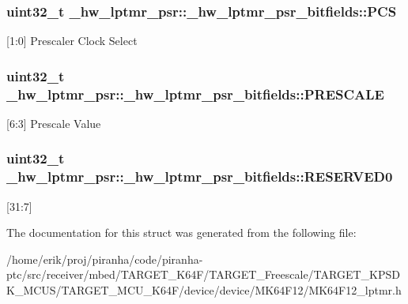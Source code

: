 \subsubsection[{\texorpdfstring{P\+CS}{PCS}}]{\setlength{\rightskip}{0pt plus 5cm}uint32\+\_\+t \+\_\+hw\+\_\+lptmr\+\_\+psr\+::\+\_\+hw\+\_\+lptmr\+\_\+psr\+\_\+bitfields\+::\+P\+CS}\hypertarget{struct__hw__lptmr__psr_1_1__hw__lptmr__psr__bitfields_a3d993db71ade53cda87fdd760944e461}{}\label{struct__hw__lptmr__psr_1_1__hw__lptmr__psr__bitfields_a3d993db71ade53cda87fdd760944e461}
\mbox{[}1\+:0\mbox{]} Prescaler Clock Select 
\subsubsection[{\texorpdfstring{P\+R\+E\+S\+C\+A\+LE}{PRESCALE}}]{\setlength{\rightskip}{0pt plus 5cm}uint32\+\_\+t \+\_\+hw\+\_\+lptmr\+\_\+psr\+::\+\_\+hw\+\_\+lptmr\+\_\+psr\+\_\+bitfields\+::\+P\+R\+E\+S\+C\+A\+LE}\hypertarget{struct__hw__lptmr__psr_1_1__hw__lptmr__psr__bitfields_ac527885cc4bac77eb8aef76aff1d8eb8}{}\label{struct__hw__lptmr__psr_1_1__hw__lptmr__psr__bitfields_ac527885cc4bac77eb8aef76aff1d8eb8}
\mbox{[}6\+:3\mbox{]} Prescale Value 
\subsubsection[{\texorpdfstring{R\+E\+S\+E\+R\+V\+E\+D0}{RESERVED0}}]{\setlength{\rightskip}{0pt plus 5cm}uint32\+\_\+t \+\_\+hw\+\_\+lptmr\+\_\+psr\+::\+\_\+hw\+\_\+lptmr\+\_\+psr\+\_\+bitfields\+::\+R\+E\+S\+E\+R\+V\+E\+D0}\hypertarget{struct__hw__lptmr__psr_1_1__hw__lptmr__psr__bitfields_a951991bdbc5b80c79a6a9b209fd12ac4}{}\label{struct__hw__lptmr__psr_1_1__hw__lptmr__psr__bitfields_a951991bdbc5b80c79a6a9b209fd12ac4}
\mbox{[}31\+:7\mbox{]} 

The documentation for this struct was generated from the following file\+:\begin{DoxyCompactItemize}
\item 
/home/erik/proj/piranha/code/piranha-\/ptc/src/receiver/mbed/\+T\+A\+R\+G\+E\+T\+\_\+\+K64\+F/\+T\+A\+R\+G\+E\+T\+\_\+\+Freescale/\+T\+A\+R\+G\+E\+T\+\_\+\+K\+P\+S\+D\+K\+\_\+\+M\+C\+U\+S/\+T\+A\+R\+G\+E\+T\+\_\+\+M\+C\+U\+\_\+\+K64\+F/device/device/\+M\+K64\+F12/M\+K64\+F12\+\_\+lptmr.\+h\end{DoxyCompactItemize}
